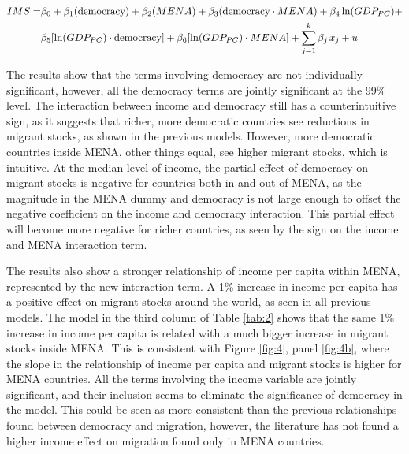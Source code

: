 \documentclass[../main.tex]{subfiles}
\begin{document}
\begin{equation}
\begin{split}
IMS=&\beta_0+\beta_1 (\text{democracy}) + \beta_2 (MENA)+ \beta_{3} (\text{democracy} \cdot MENA)+\beta_4 \ln (GDP_{PC}) + \\ 
     &\beta_5 [ \ln (GDP_{PC}) \cdot \text{democracy}]+\beta_6 [ \ln (GDP_{PC}) \cdot MENA]+\sum_{j=1}^k \beta_j\hspace{0.05cm} x_j+u 
     \end{split}
    \label{eqn:5}
\end{equation}

The results show that the terms involving democracy are not individually significant, however, all the democracy terms are jointly significant at the 99\% level. The interaction between income and democracy still has a counterintuitive sign, as it suggests that richer, more democratic countries see reductions in migrant stocks, as shown in the previous models. However, more democratic countries inside MENA, other things equal, see higher migrant stocks, which is intuitive. At the median level of income, the partial effect of democracy on migrant stocks is negative for countries both in and out of MENA, as the magnitude in the MENA dummy and democracy is not large enough to offset the negative coefficient on the income and democracy interaction. This partial effect will become more negative for richer countries, as seen by the sign on the income and MENA interaction term. 

The results also show a stronger relationship of income per capita within MENA, represented by the new interaction term. A 1\% increase in income per capita has a positive effect on migrant stocks around the world, as seen in all previous models. The model in the third column of Table \ref{tab:2} shows that the same 1\% increase in income per capita is related with a much bigger increase in migrant stocks inside MENA. This is consistent with Figure \ref{fig:4}, panel \ref{fig:4b}, where the slope in the relationship of income per capita and migrant stocks is higher for MENA countries. All the terms involving the income variable are jointly significant, and their inclusion seems to eliminate the significance of democracy in the model. This could be seen as more consistent than the previous relationships found between democracy and migration, however, the literature has not found a higher income effect on migration found only in MENA countries. 
\end{document}
